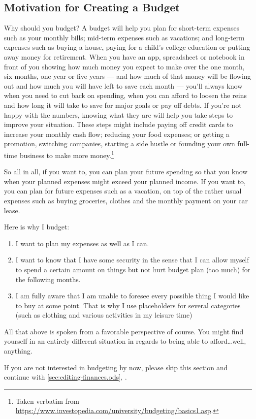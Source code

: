 \subsection{Motivation for Creating a Budget}
\label{subsec:motivation-creating-budget}

Why should you budget? A budget will help you plan for short-term expenses such as your monthly bills; mid-term expenses such as vacations; and long-term expenses such as buying a house, paying for a child’s college education or putting away money for retirement.
When you have an app, spreadsheet or notebook in front of you showing how much money you expect to make over the one month, six months, one year or five years --- and how much of that money will be flowing out and how much you will have left to save each month --- you’ll always know when you need to cut back on spending, when you can afford to loosen the reins and how long it will take to save for major goals or pay off debts.
If you’re not happy with the numbers, knowing what they are will help you take steps to improve your situation.
These steps might include paying off credit cards to increase your monthly cash flow; reducing your food expenses; or getting a promotion, switching companies, starting a side hustle or founding your own full-time business to make more money.\footnote{Taken verbatim from \url{https://www.investopedia.com/university/budgeting/basics1.asp}.}

So all in all, if you want to, you can plan your future spending so that you know when your planned expenses might exceed your planned income.
If you want to, you can plan for future expenses such as a vacation, on top of the rather usual expenses such as buying groceries, clothes and the monthly payment on your car lease.

Here is why I budget:
\begin{enumerate}
	\item I want to plan my expenses as well as I can.
	\item I want to know that I have some security in the sense that I can allow myself to spend a certain amount on things but not hurt budget plan (too much) for the following months.
	\item I am fully aware that I am unable to foresee every possible thing I would like to buy at some point.
	That is why I use placeholders for several categories (such as clothing and various activities in my leisure time)
\end{enumerate}

All that above is spoken from a favorable perspective of course.
You might find yourself in an entirely different situation in regards to being able to afford\ldots well, anything.

\begin{specialnote}
	If you are not interested in budgeting by now, please skip this section and continue with \autoref{sec:editing-finances.ods}, .
\end{specialnote}

